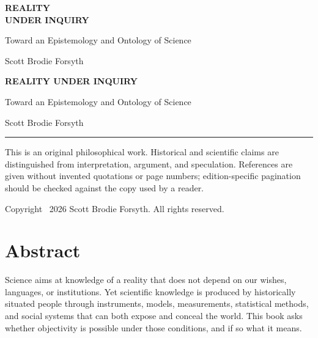 \documentclass[11pt,openright]{book}
\begin{document}
\begin{titlepage}
  \pagecolor{covernavy}
  \color{white}
  \thispagestyle{empty}
  \vspace*{0.22\textheight}
  {\raggedright\fontsize{31}{35}\selectfont\bfseries REALITY\\UNDER INQUIRY\par}
  \vspace{1.6em}
  {\raggedright\fontsize{13}{18}\selectfont Toward an Epistemology and Ontology of Science\par}
  \vfill
  {\raggedright\large Scott Brodie Forsyth\par}
\end{titlepage}
\nopagecolor
\color{ink}

\frontmatter
\thispagestyle{empty}
\begin{center}
  {\Large\bfseries REALITY UNDER INQUIRY\par}
  \vspace{0.4em}
  {\large Toward an Epistemology and Ontology of Science\par}
  \vspace{1.2em}
  {\large Scott Brodie Forsyth\par}
\end{center}
\vfill
\noindent\rule{\textwidth}{0.35pt}\par
\small
This is an original philosophical work. Historical and scientific claims are
distinguished from interpretation, argument, and speculation. References are
given without invented quotations or page numbers; edition-specific pagination
should be checked against the copy used by a reader.
\vspace{1em}

Copyright \textcopyright\ 2026 Scott Brodie Forsyth. All rights reserved.
\clearpage

\chapter*{Abstract}
Science aims at knowledge of a reality that does not depend on our wishes,
languages, or institutions. Yet scientific knowledge is produced by historically
situated people through instruments, models, measurements, statistical methods,
and social systems that can both expose and conceal the world. This book asks
whether objectivity is possible under those conditions, and if so what it means.
\end{document}
